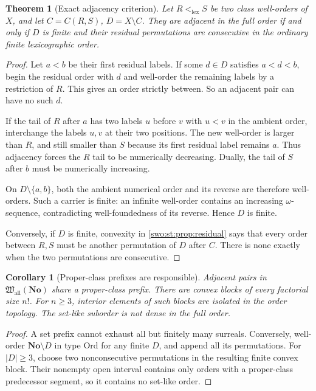 \documentclass[11pt]{article}
\newtheorem{theorem}{Theorem}[section]
\newtheorem{corollary}[corollary]{Corollary}
\theoremstyle{definition}
\theoremstyle{remark}
\newcommand{\No}{\mathbf{No}}
\newcommand{\Ord}{\mathrm{Ord}}
\newcommand{\Hall}{\mathfrak W_{\mathrm{all}}}
\newcommand{\lex}{\mathrm{lex}}
\begin{document}
\begin{theorem}[Exact adjacency criterion]\label{swo:st:thm:adjacency}
Let $R<_{\lex}S$ be two class well-orders of $X$, and let
$C=C(R,S)$, $D=X\setminus C$. They are adjacent in the full order if and
only if $D$ is finite and their residual permutations are consecutive in
the ordinary finite lexicographic order.
\end{theorem}
\begin{proof}
Let $a<b$ be their first residual labels. If some $d\in D$ satisfies
$a<d<b$, begin the residual order with $d$ and well-order the remaining
labels by a restriction of $R$. This gives an order strictly between.
So an adjacent pair can have no such $d$.

If the tail of $R$ after $a$ has two labels $u$ before $v$ with $u<v$ in
the ambient order, interchange the labels $u,v$ at their two positions.
The new well-order is larger than $R$, and still smaller than $S$ because
its first residual label remains $a$. Thus adjacency forces the $R$ tail
to be numerically decreasing. Dually, the tail of $S$ after $b$ must be
numerically increasing.

On $D\setminus\{a,b\}$, both the ambient numerical order and its reverse
are therefore well-orders. Such a carrier is finite: an infinite
well-order contains an increasing $\omega$-sequence, contradicting
well-foundedness of its reverse. Hence $D$ is finite.

Conversely, if $D$ is finite, convexity in \cref{swo:st:prop:residual} says that
every order between $R,S$ must be another permutation of $D$ after $C$.
There is none exactly when the two permutations are consecutive.
\end{proof}

\begin{corollary}[Proper-class prefixes are responsible]\label{swo:st:n8.4}
Adjacent pairs in $\Hall(\No)$ share a proper-class prefix.
There are convex blocks of every factorial size $n!$. For $n\geq3$,
interior elements of such blocks are isolated in the order topology.
The set-like suborder is not dense in the full order.
\end{corollary}
\begin{proof}
A set prefix cannot exhaust all but finitely many surreals. Conversely,
well-order $\No\setminus D$ in type $\Ord$ for any finite $D$, and append
all its permutations. For $|D|\geq3$, choose two nonconsecutive
permutations in the resulting finite convex block. Their nonempty open
interval contains only orders with a proper-class predecessor segment,
so it contains no set-like order.
\end{proof}
\end{document}
